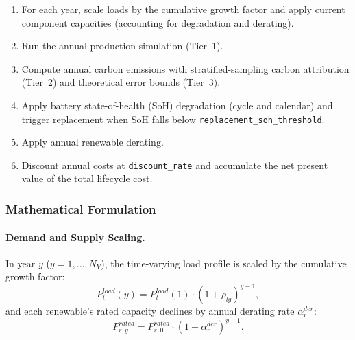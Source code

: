 \begin{enumerate}
  \item For each year, scale loads by the cumulative growth factor and
        apply current component capacities (accounting for degradation and
        derating).
  \item Run the annual production simulation (Tier~1).
  \item Compute annual carbon emissions with stratified-sampling carbon
        attribution (Tier~2) and theoretical error bounds (Tier~3).
  \item Apply battery state-of-health (SoH) degradation (cycle and
        calendar) and trigger replacement when SoH falls below
        \texttt{replacement\_soh\_threshold}.
  \item Apply annual renewable derating.
  \item Discount annual costs at \texttt{discount\_rate} and accumulate
        the net present value of the total lifecycle cost.
\end{enumerate}

\subsubsection{Mathematical Formulation}

\paragraph{Demand and Supply Scaling.}
In year $y$ ($y=1,\ldots,N_Y$), the time-varying load profile is scaled by the
cumulative growth factor:
\begin{equation}
  P_t^{load}(y) = P_t^{load}(1)\cdot(1+\rho_{lg})^{y-1},
\end{equation}
and each renewable's rated capacity declines by annual derating rate
$\alpha_r^{der}$:
\begin{equation}
  P_{r,y}^{rated} = P_{r,0}^{rated}\cdot(1-\alpha_r^{der})^{y-1}.
\end{equation}

